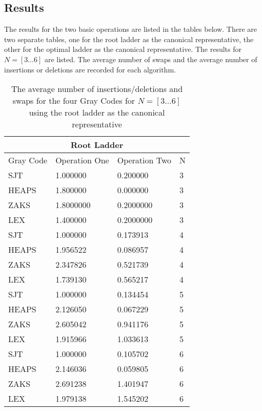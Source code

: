 \subsection{Results}

The results for the two basic operations are listed in the tables below. There are two separate tables, one 
for the root ladder as the canonical representative, the other for the optimal ladder as the canonical representative.
The results for $N=[3 \dots 6]$ are listed. The average number of swaps and the average number of insertions or deletions are 
recorded for each algorithm.

\begin{table}
\begin{tabular}{ |p{3cm}||p{3cm}|p{3cm}|p{3cm}|}
 \hline
 \multicolumn{4}{|c|}{Root Ladder} \\
 \hline
 Gray Code& Operation One &Operation Two& N\\
 \hline
 SJT  & 1.000000 &0.200000 & 3\\
 HEAPS & 1.800000 & 0.000000 & 3 \\
 ZAKS & 1.8000000 & 0.2000000 &  3\\
 LEX & 1.400000 & 0.2000000 &  3\\
 \hline

 SJT  & 1.000000 &0.173913 & 4\\
 HEAPS & 1.956522 & 0.086957 & 4 \\
 ZAKS & 2.347826 & 0.521739 &  4\\
 LEX & 1.739130 & 0.565217 &  4\\
 \hline
 
 SJT  & 1.000000 &0.134454& 5\\
 HEAPS & 2.126050 & 0.067229 & 5 \\
 ZAKS & 2.605042 & 0.941176 &  5\\
 LEX & 1.915966 & 1.033613 &  5\\
 \hline
 
 SJT  & 1.000000 &0.105702 & 6\\
 HEAPS & 2.146036 & 0.059805 & 6\\
 ZAKS & 2.691238 & 1.401947 &  6\\
 LEX & 1.979138 & 1.545202&  6\\
 \hline
\end{tabular}
\caption{\label{tab:table-name}The average number of insertions/deletions and swaps for 
the four Gray Codes for $N=[3 \dots 6]$ using the root ladder as the canonical representative }
\end{table}\pagebreak

